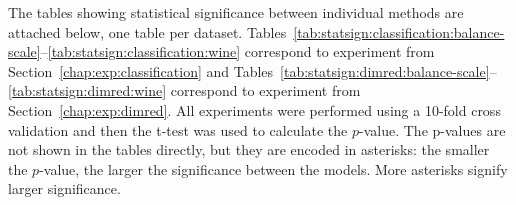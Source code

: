 \documentclass[12pt,a4paper]{report}
\let\openright=\clearpage
\begin{document}



\listoffigures

\listofalgorithmes

\listoftables


\printacronyms[include-classes=abbrev,heading=none] %



 \label{chap:attachments}

The tables showing statistical significance between individual methods are attached below, one table per dataset. Tables~\ref{tab:statsign:classification:balance-scale}--\ref{tab:statsign:classification:wine} correspond to experiment from Section~\ref{chap:exp:classification} and Tables~\ref{tab:statsign:dimred:balance-scale}--\ref{tab:statsign:dimred:wine} correspond to experiment from Section~\ref{chap:exp:dimred}. All experiments were performed using a 10-fold cross validation and then the t-test was used to calculate the $p$-value. The p-values are not shown in the tables directly, but they are encoded in asterisks: the smaller the $p$-value, the larger the significance between the models. More asterisks signify larger significance.




\openright
\end{document}
